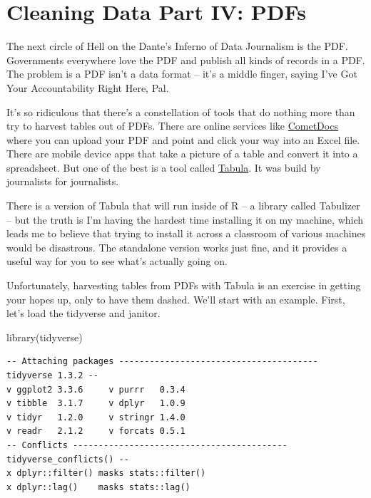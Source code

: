 \documentclass[
  letterpaper,
  DIV=11,
  numbers=noendperiod]{scrreprt}
\newenvironment{Shaded}{\begin{snugshade}}{\end{snugshade}}
\newcommand{\FunctionTok}[1]{\textcolor[rgb]{0.28,0.35,0.67}{#1}}
\newcommand{\NormalTok}[1]{\textcolor[rgb]{0.00,0.23,0.31}{#1}}
\begin{document}
\hypertarget{cleaning-data-part-iv-pdfs}{%
\chapter{Cleaning Data Part IV: PDFs}\label{cleaning-data-part-iv-pdfs}}

The next circle of Hell on the Dante's Inferno of Data Journalism is the
PDF. Governments everywhere love the PDF and publish all kinds of
records in a PDF. The problem is a PDF isn't a data format -- it's a
middle finger, saying I've Got Your Accountability Right Here, Pal.

It's so ridiculous that there's a constellation of tools that do nothing
more than try to harvest tables out of PDFs. There are online services
like \href{https://www.cometdocs.com/}{CometDocs} where you can upload
your PDF and point and click your way into an Excel file. There are
mobile device apps that take a picture of a table and convert it into a
spreadsheet. But one of the best is a tool called
\href{https://tabula.technology/}{Tabula}. It was build by journalists
for journalists.

There is a version of Tabula that will run inside of R -- a library
called Tabulizer -- but the truth is I'm having the hardest time
installing it on my machine, which leads me to believe that trying to
install it across a classroom of various machines would be disastrous.
The standalone version works just fine, and it provides a useful way for
you to see what's actually going on.

Unfortunately, harvesting tables from PDFs with Tabula is an exercise in
getting your hopes up, only to have them dashed. We'll start with an
example. First, let's load the tidyverse and janitor.

\begin{Shaded}
\begin{Highlighting}[]
\FunctionTok{library}\NormalTok{(tidyverse)}
\end{Highlighting}
\end{Shaded}

\begin{verbatim}
-- Attaching packages --------------------------------------- tidyverse 1.3.2 --
v ggplot2 3.3.6     v purrr   0.3.4
v tibble  3.1.7     v dplyr   1.0.9
v tidyr   1.2.0     v stringr 1.4.0
v readr   2.1.2     v forcats 0.5.1
-- Conflicts ------------------------------------------ tidyverse_conflicts() --
x dplyr::filter() masks stats::filter()
x dplyr::lag()    masks stats::lag()
\end{verbatim}
\end{document}
